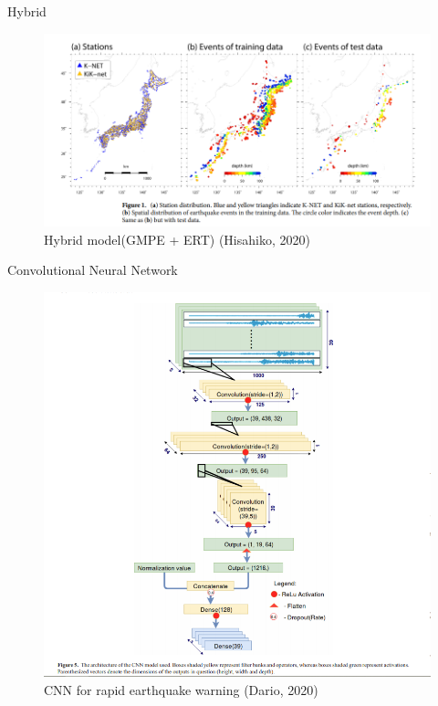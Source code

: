\documentclass{beamer}
\begin{document}
	\begin{frame}[t]{Hybrid}
		\begin{figure}
			\includegraphics[scale=0.5]{hybrid.png}
			\caption{Hybrid model(GMPE + ERT) (Hisahiko, 2020)}
		\end{figure}
	\end{frame}
	
	
	\begin{frame}[t]{Convolutional Neural Network}
		\begin{figure}
			\includegraphics[scale=0.3]{cnn.png}
			\caption{CNN for rapid earthquake warning (Dario, 2020)}
		\end{figure}
	\end{frame}
	
\end{document}
